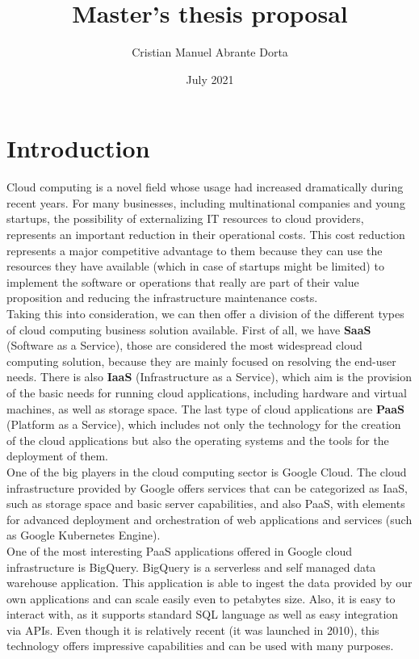\documentclass[12pt]{article}
\title{Master's thesis proposal}
\author{Cristian Manuel Abrante Dorta}
\date{July 2021}
\begin{document}
\maketitle

\section{Introduction}

Cloud computing is a novel field whose usage had increased dramatically during recent years. For many businesses, including multinational companies and young startups, the possibility of externalizing IT resources to cloud providers, represents an important reduction in their operational costs. This cost reduction represents a major competitive advantage to them because they can use the resources they have available (which in case of startups might be limited) to implement the software or operations that really are part of their value proposition and reducing the infrastructure maintenance costs. \\

Taking this into consideration, we can then offer a division of the different types of cloud computing business solution available. First of all, we have \textbf{SaaS} (Software as a Service), those are considered the most widespread cloud computing solution, because they are mainly focused on resolving the end-user needs. There is also \textbf{IaaS} (Infrastructure as a Service), which aim is the provision of the basic needs for running cloud applications, including hardware and virtual machines, as well as storage space. The last type of cloud applications are \textbf{PaaS} (Platform as a Service), which includes not only the technology for the creation of the cloud applications but also the operating systems and the tools for the deployment of them. \\

One of the big players in the cloud computing sector is Google Cloud. The cloud infrastructure provided by Google offers services that can be categorized as IaaS, such as storage space and basic server capabilities, and also PaaS, with elements for advanced deployment and orchestration of web applications and services (such as Google Kubernetes Engine). \\

One of the most interesting PaaS applications offered in Google cloud infrastructure is BigQuery. BigQuery is a serverless and self managed data warehouse application. This application is able to ingest the data provided by our own applications and can scale easily even to petabytes size. Also, it is easy to interact with, as it supports standard SQL language as well as easy integration via APIs. Even though it is relatively recent (it was launched in 2010), this technology offers impressive capabilities and can be used with many purposes.\\
\end{document}
